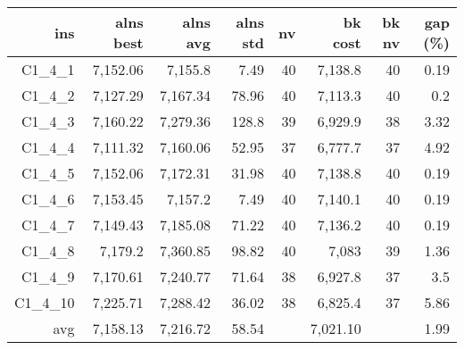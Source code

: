   \begin{table}[caption={Kết quả đo với tập HG\_C\_1\_4 400 yêu cầu}, label=exp:HGC14]
    \centering
    \begin{tabular}{rrrrrrrr}
    \hline
    ins & alns best & alns avg & alns std & nv & bk cost & bk nv & gap (\%) \\ \hline
    C1\_4\_1 & 7,152.06 & 7,155.8 & 7.49 & 40 & 7,138.8 & 40 & 0.19 \\ \hline
    C1\_4\_2 & 7,127.29 & 7,167.34 & 78.96 & 40 & 7,113.3 & 40 & 0.2 \\ \hline
    C1\_4\_3 & 7,160.22 & 7,279.36 & 128.8 & 39 & 6,929.9 & 38 & 3.32 \\ \hline
    C1\_4\_4 & 7,111.32 & 7,160.06 & 52.95 & 37 & 6,777.7 & 37 & 4.92 \\ \hline
    C1\_4\_5 & 7,152.06 & 7,172.31 & 31.98 & 40 & 7,138.8 & 40 & 0.19 \\ \hline
    C1\_4\_6 & 7,153.45 & 7,157.2 & 7.49 & 40 & 7,140.1 & 40 & 0.19 \\ \hline
    C1\_4\_7 & 7,149.43 & 7,185.08 & 71.22 & 40 & 7,136.2 & 40 & 0.19 \\ \hline
    C1\_4\_8 & 7,179.2 & 7,360.85 & 98.82 & 40 & 7,083 & 39 & 1.36 \\ \hline
    C1\_4\_9 & 7,170.61 & 7,240.77 & 71.64 & 38 & 6,927.8 & 37 & 3.5 \\ \hline
    C1\_4\_10 & 7,225.71 & 7,288.42 & 36.02 & 38 & 6,825.4 & 37 & 5.86 \\ \hline
    avg & 7,158.13 & 7,216.72 & 58.54 & & 7,021.10 & & 1.99 \\ \hline
    \end{tabular}
  \end{table}

